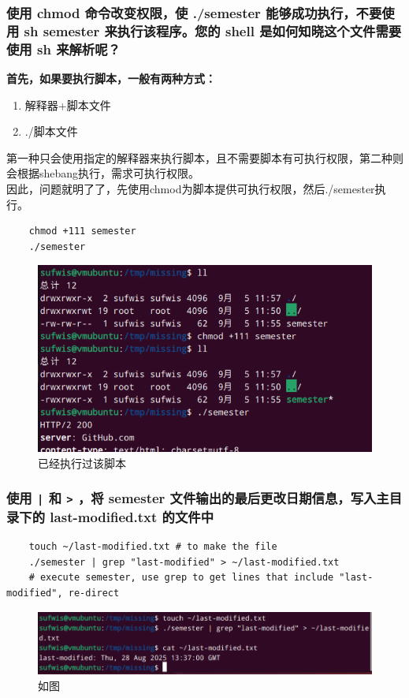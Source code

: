 \documentclass[UTF8]{ctexart}
\begin{document}
\subsubsection{使用 chmod 命令改变权限，使 ./semester 能够成功执行，不要使用 sh semester 来执行该程序。您的 shell 是如何知晓这个文件需要使用 sh 来解析呢？}
\hbox{\textbf{首先，如果要执行脚本，一般有两种方式：}}
\begin{enumerate}
	\item 解释器+脚本文件
	\item ./脚本文件
\end{enumerate}
第一种只会使用指定的解释器来执行脚本，且不需要脚本有可执行权限，第二种则会根据shebang执行，需求可执行权限。\\
因此，问题就明了了，先使用chmod为脚本提供可执行权限，然后./semester执行。\\
\begin{lstlisting}
	chmod +111 semester
	./semester
\end{lstlisting}
\begin{figure}[htbp]
	\centering
	\includegraphics[width=0.7\linewidth]{figures/bash_se.png}
	\caption{已经执行过该脚本}
\end{figure}

\subsubsection{使用 \texttt{|} 和 \texttt{>} ，将 semester 文件输出的最后更改日期信息，写入主目录下的 last-modified.txt 的文件中}
\begin{lstlisting}
	touch ~/last-modified.txt # to make the file
	./semester | grep "last-modified" > ~/last-modified.txt
	# execute semester, use grep to get lines that include "last-modified", re-direct
\end{lstlisting}
\begin{figure}[H]
	\centering
	\includegraphics[width=0.7\linewidth]{figures/grep.png}
	\caption{如图}
\end{figure}
\end{document}
